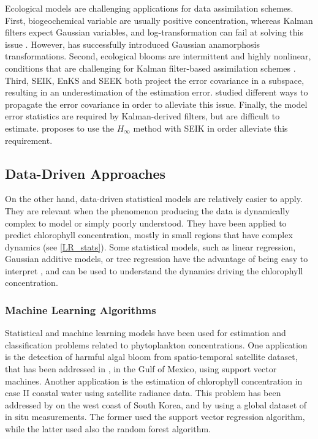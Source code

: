 Ecological models are challenging applications for data assimilation schemes. First, biogeochemical variable are usually positive concentration, whereas Kalman filters expect Gaussian variables, and log-transformation can fail at solving this issue \cite{Ciavatta2011}. However, \cite{Fontana2013} has successfully introduced Gaussian anamorphosis transformations. Second, ecological blooms are intermittent and highly nonlinear, conditions that are challenging for Kalman filter-based assimilation schemes \cite{Triantafyllou2012, Korres2012}. Third, SEIK, EnKS and SEEK both project the error covariance in a subspace, resulting in an underestimation of the estimation error. \cite{Butenschon2012} studied different ways to propagate the error covariance in order to alleviate this issue. Finally, the model error statistics are required by Kalman-derived filters, but are difficult to estimate. \cite{Triantafyllou2012} proposes to use the $H_\infty$ method with SEIK in order alleviate this requirement.

\subsection{Data-Driven Approaches}

On the other hand, data-driven statistical models are relatively easier to apply. They are relevant when the phenomenon producing the data is dynamically complex to model or simply poorly understood. They have been applied to predict chlorophyll concentration, mostly in small regions that have complex dynamics (see \ref{LR_stats}). Some statistical models, such as linear regression, Gaussian additive models, or tree regression have the advantage of being easy to interpret \cite{Gareth2013}, and can be used to understand the dynamics driving the chlorophyll concentration.

\subsubsection{Machine Learning Algorithms}

Statistical and machine learning models have been used for estimation and classification problems related to phytoplankton concentrations. One application is the detection of harmful algal bloom from spatio-temporal satellite dataset, that has been addressed in \cite{Gokaraju2011}, in the Gulf of Mexico, using support vector machines. Another application is the estimation of chlorophyll concentration in case II coastal water using satellite radiance data. This problem has been addressed by \cite{Kim2014} on the west coast of South Korea, and by \cite{Camps-Valls2006} using a global dataset of in situ measurements. The former used the support vector regression algorithm, while the latter used also the random forest algorithm.

